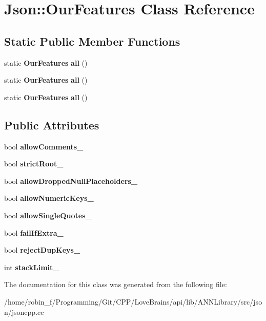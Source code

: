 \section{Json\+:\+:Our\+Features Class Reference}
\label{class_json_1_1_our_features}
\subsection*{Static Public Member Functions}
\begin{DoxyCompactItemize}
\item 
static {\bf Our\+Features} {\bfseries all} ()\label{class_json_1_1_our_features_a0686e1406b6677f496529f9f3fe98d1e}

\item 
static {\bf Our\+Features} {\bfseries all} ()\label{class_json_1_1_our_features_a6ef225b54e7889cc00837c36be5bdb71}

\item 
static {\bf Our\+Features} {\bfseries all} ()\label{class_json_1_1_our_features_a6ef225b54e7889cc00837c36be5bdb71}

\end{DoxyCompactItemize}
\subsection*{Public Attributes}
\begin{DoxyCompactItemize}
\item 
bool {\bfseries allow\+Comments\+\_\+}\label{class_json_1_1_our_features_ac71bb7ba7363d3b05ed76602b036ce33}

\item 
bool {\bfseries strict\+Root\+\_\+}\label{class_json_1_1_our_features_a2095f66a776c0a4ae6cc931a0c94242e}

\item 
bool {\bfseries allow\+Dropped\+Null\+Placeholders\+\_\+}\label{class_json_1_1_our_features_a13963bc44bf948eec1968f7ff8e8f5f1}

\item 
bool {\bfseries allow\+Numeric\+Keys\+\_\+}\label{class_json_1_1_our_features_af6973fc7e774ce2d634ba99442aeb91a}

\item 
bool {\bfseries allow\+Single\+Quotes\+\_\+}\label{class_json_1_1_our_features_abbd6c196d7a22e2a360a59887eda4610}

\item 
bool {\bfseries fail\+If\+Extra\+\_\+}\label{class_json_1_1_our_features_ae8ad25b90706c78f1a8fe929191ac61b}

\item 
bool {\bfseries reject\+Dup\+Keys\+\_\+}\label{class_json_1_1_our_features_a39b8e0b86b1c24a45e800c023bb715aa}

\item 
int {\bfseries stack\+Limit\+\_\+}\label{class_json_1_1_our_features_a9a786713902d14be6d57a08cc03ccfff}

\end{DoxyCompactItemize}


The documentation for this class was generated from the following file\+:\begin{DoxyCompactItemize}
\item 
/home/robin\+\_\+f/\+Programming/\+Git/\+C\+P\+P/\+Love\+Brains/api/lib/\+A\+N\+N\+Library/src/json/jsoncpp.\+cc\end{DoxyCompactItemize}
